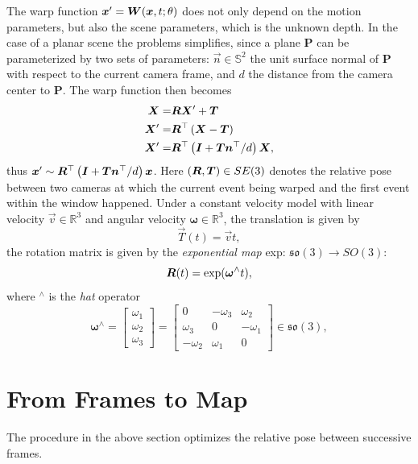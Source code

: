 \label{sec:planar_homo}
The warp function $\vec{x}'=\mat{W}(\vec{x},t;\theta)$ does
not only depend on the motion parameters, but also the scene
parameters, which is the unknown depth.  In the case of a planar scene
the problems simplifies, since a plane $\mathbf{P}$ can be
parameterized by two sets of parameters: $\vec{n}\in\mathbb{S}^2$ the
unit surface normal of $\mathbf{P}$ with respect to the current camera
frame, and $d$ the distance from the camera center to
$\mathbf{P}$. The warp function then becomes
\begin{align}
  \label{eq:planar_homo}
  \vec{X}=&\mat{R}\vec{X}'+\vec{T}\\
  \vec{X}'=&\mat{R}^\top\left(\vec{X}-\vec{T}\right)\\
  \vec{X}'=&\mat{R}^\top\left(\mat{I}+\vec{T}\vec{n}^\top/d\right)\vec{X},
\end{align}
thus
$\vec{x}'\sim\mat{R}^\top\left(\mat{I}+\vec{T}\vec{n}^\top/d\right)\vec{x}$.
Here $(\mat{R}, \vec{T})\in SE(3)$ denotes the relative pose between
two cameras at which the current event being warped and the first
event within the window happened. Under a constant velocity model with
linear velocity $\vec{v}\in\mathbb{R}^3$ and angular velocity
$\bm{\omega}\in\mathbb{R}^3$, the translation is given by
\begin{equation}
  \label{eq:translation}
  \vec{T}(t)=\vec{v}t,
\end{equation}
the rotation matrix is given by the \textit{exponential map} exp:
$\mathfrak{so}(3)\rightarrow SO(3)$:
\begin{equation}
  \label{eq:rotation}
  \mat{R}(t)=\mathrm{exp}(\bm{\omega}^\wedge t),
\end{equation}
where $^\wedge$ is the \textit{hat} operator
\begin{equation}
  \label{eq:hat}
  \bm{\omega}^\wedge=
  \begin{bmatrix}
    \omega_1\\\omega_2\\\omega_3
  \end{bmatrix}
  =
  \begin{bmatrix}
    0&-\omega_3&\omega_2\\
    \omega_3&0&-\omega_1\\
    -\omega_2&\omega_1&0
  \end{bmatrix}
  \in\mathfrak{so}(3),
\end{equation}

\section{From Frames to Map}
\label{sec:mapping}
The procedure in the above section optimizes the relative pose between
successive frames.


